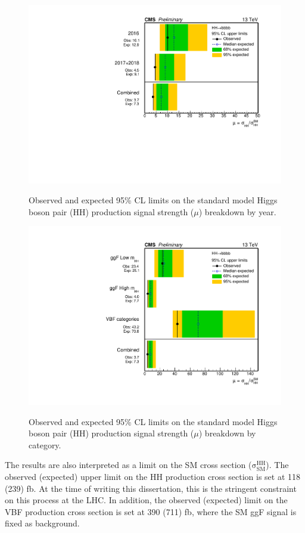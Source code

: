 \begin{figure}[!htb]
\centering
{\includegraphics[width=0.55\linewidth] {Figures/Results/additional/CMS-PAS-HIG-20-005_Figure-aux_011.pdf}}
\caption[Observed and expected 95\% CL limits on the standard model Higgs boson pair (HH) production signal strength breakdown by year]{\label{fig:limitsbyyear}
Observed and expected 95\% CL limits on the standard model Higgs boson pair (HH) production signal strength ($\mu$) breakdown by year.}
\end{figure}

\begin{figure}[!htb]
\centering
{\includegraphics[width=0.5\linewidth] {Figures/Results/additional/CMS-PAS-HIG-20-005_Figure-aux_012.pdf}}
\caption[Observed and expected 95\% CL limits on the standard model Higgs boson pair (HH) production signal strength breakdown by category]{\label{fig:limitsbycateg}
Observed and expected 95\% CL limits on the standard model Higgs boson pair (HH) production signal strength ($\mu$) breakdown by category.}
\end{figure}

The results are also interpreted as a limit on the SM cross section ($\mathrm{\sigma_{SM}^{HH}}$). The observed (expected) upper limit on the HH production cross section is set at 118 (239) fb. At the time of writing this dissertation, this is the stringent constraint on this process at the LHC. In addition, the observed (expected) limit on the VBF production cross section is set at 390 (711) fb, where the SM ggF signal is fixed as background.

